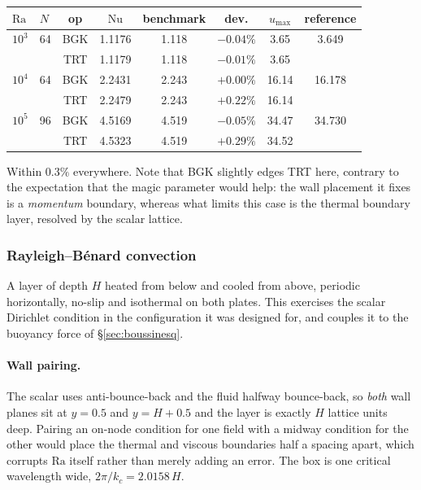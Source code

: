 \documentclass[11pt,a4paper]{article}
\begin{document}
\begin{center}\small
\begin{tabular}{llcccccc}
\toprule
$\mathrm{Ra}$ & $N$ & op & $\mathrm{Nu}$ & benchmark & dev. & $u_{\max}$ & reference \\
\midrule
$10^3$ & 64 & BGK & 1.1176 & 1.118 & $-0.04\%$ & 3.65 & 3.649 \\
       &    & TRT & 1.1179 & 1.118 & $-0.01\%$ & 3.65 & \\
$10^4$ & 64 & BGK & 2.2431 & 2.243 & $+0.00\%$ & 16.14 & 16.178 \\
       &    & TRT & 2.2479 & 2.243 & $+0.22\%$ & 16.14 & \\
$10^5$ & 96 & BGK & 4.5169 & 4.519 & $-0.05\%$ & 34.47 & 34.730 \\
       &    & TRT & 4.5323 & 4.519 & $+0.29\%$ & 34.52 & \\
\bottomrule
\end{tabular}
\end{center}

\noindent Within $0.3\%$ everywhere. Note that BGK slightly edges TRT here,
contrary to the expectation that the magic parameter would help: the wall
placement it fixes is a \emph{momentum} boundary, whereas what limits this case is
the thermal boundary layer, resolved by the scalar lattice.
\subsubsection{Rayleigh--B\'enard convection}
\label{sec:rbconv}
\label{sec:rb}

A layer of depth $H$ heated from below and cooled from above, periodic
horizontally, no-slip and isothermal on both plates. This exercises the scalar
Dirichlet condition in the configuration it was designed for, and couples it to
the buoyancy force of \S\ref{sec:boussinesq}.

\paragraph{Wall pairing.} The scalar uses anti-bounce-back and the fluid halfway
bounce-back, so \emph{both} wall planes sit at $y=0.5$ and $y=H+0.5$ and the
layer is exactly $H$ lattice units deep. Pairing an on-node condition for one
field with a midway condition for the other would place the thermal and viscous
boundaries half a spacing apart, which corrupts $\mathrm{Ra}$ itself rather than
merely adding an error. The box is one critical wavelength wide,
$2\pi/k_c = 2.0158\,H$.
\end{document}
